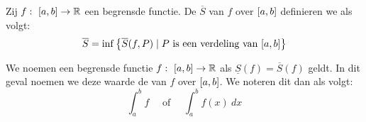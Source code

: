 \documentclass[main.tex]{subfiles}
\begin{document}
\begin{de}
  Zij $f:\ \interval{a}{b} \rightarrow \mathbb{R}$ een begrensde functie.
  De  $\overline{S}$ van $f$ over $\interval{a}{b}$ definieren we als volgt:
  \[ \overline{S} = \inf\left\{\overline{S}(f,P) \mid P \text{ is een verdeling van } \interval{a}{b} \right\} \]
\end{de}

\begin{de}
  We noemen een begrensde functie $f:\ \interval{a}{b} \rightarrow \mathbb{R}$  als $\underline{S}(f) = \overline{S}(f)$ geldt.
  In dit geval noemen we deze waarde de  van $f$ over $\interval{a}{b}$.
  We noteren dit dan als volgt:
  \[ \int_{a}^{b}f \quad\text{ of }\quad \int_{a}^{b}f(x)\ dx \]
\end{de}
\end{document}
